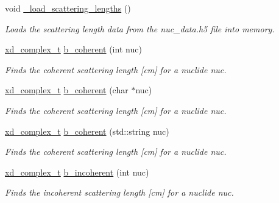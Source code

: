 \begin{DoxyCompactItemize}
\mbox{\label{namespacepyne_a5731f21182f208aa6692bf9b3b3867c0}} 
void \hyperlink{namespacepyne_a5731f21182f208aa6692bf9b3b3867c0}{\+\_\+load\+\_\+scattering\+\_\+lengths} ()
\begin{DoxyCompactList}\small\item\em Loads the scattering length data from the nuc\+\_\+data.\+h5 file into memory. \end{DoxyCompactList}\item 
\hyperlink{structxd__complex__t}{xd\+\_\+complex\+\_\+t} \hyperlink{namespacepyne_a94620ef1a92c4562e8d4d54242428ab8}{b\+\_\+coherent} (int nuc)
\begin{DoxyCompactList}\small\item\em Finds the coherent scattering length \mbox{[}cm\mbox{]} for a nuclide {\itshape nuc}. \end{DoxyCompactList}\item 
\mbox{\label{namespacepyne_a5ec92f6c1f9b71644af8290272e58aca}} 
\hyperlink{structxd__complex__t}{xd\+\_\+complex\+\_\+t} \hyperlink{namespacepyne_a5ec92f6c1f9b71644af8290272e58aca}{b\+\_\+coherent} (char $\ast$nuc)
\begin{DoxyCompactList}\small\item\em Finds the coherent scattering length \mbox{[}cm\mbox{]} for a nuclide {\itshape nuc}. \end{DoxyCompactList}\item 
\mbox{\label{namespacepyne_a2df8a4dfc9f5bd2c8b673dd370a482af}} 
\hyperlink{structxd__complex__t}{xd\+\_\+complex\+\_\+t} \hyperlink{namespacepyne_a2df8a4dfc9f5bd2c8b673dd370a482af}{b\+\_\+coherent} (std\+::string nuc)
\begin{DoxyCompactList}\small\item\em Finds the coherent scattering length \mbox{[}cm\mbox{]} for a nuclide {\itshape nuc}. \end{DoxyCompactList}\item 
\hyperlink{structxd__complex__t}{xd\+\_\+complex\+\_\+t} \hyperlink{namespacepyne_a2f07313175b4a12453fcd84aca062f06}{b\+\_\+incoherent} (int nuc)
\begin{DoxyCompactList}\small\item\em Finds the incoherent scattering length \mbox{[}cm\mbox{]} for a nuclide {\itshape nuc}. \end{DoxyCompactList}\item 

\end{DoxyCompactItemize}
